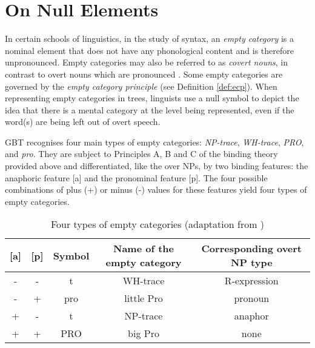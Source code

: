 \section{On Null Elements}
\label{sec:null-elements-gbt}
In certain schools of linguistics, in the study of syntax, an \textit{empty category} is a nominal element that does not have any phonological content and is therefore unpronounced. Empty categories may also be referred to as \textit{covert nouns}, in contrast to overt nouns which are pronounced \citep{Chomsky1993lectures}. Some empty categories are governed by the \textit{empty category principle} (see Definition \ref{def:ecp}). When representing empty categories in trees, linguists use a null symbol to depict the idea that there is a mental category at the level being represented, even if the word(s) are being left out of overt speech. 

GBT recognises four main types of empty categories: \textit{NP-trace}, \textit{WH-trace}, \textit{PRO}, and \textit{pro}. They are subject to Principles A, B and C of the binding theory provided above and differentiated, like the over NPs, by two binding features: the anaphoric feature [a] and the pronominal feature [p]. The four possible combinations of plus (+) or minus (-) values for these features yield four types of empty categories. 

\begin{table}[!ht]
	\centering
		\begin{tabulary}{\linewidth}{|c|c|c|C|C|}
			\hline
			\textbf{{[}a{]}} & \textbf{{[}p{]}} & \textbf{Symbol} & \textbf{Name of the empty category} & \textbf{Corresponding overt NP type} \\ \hline
			-                & -                & t               & WH-trace                        & R-expression                           \\ \hline
			-                & +                & pro             & little Pro                      & pronoun                                \\ \hline
			+                & -                & t               & NP-trace                        & anaphor                                \\ \hline
			+                & +                & PRO             & big Pro                         & none                                   \\ \hline
		\end{tabulary}%
	\caption{Four types of empty categories 
(adaptation from \citep[436]{Haegeman1991})}
	\label{tab:null-types}
\end{table}


